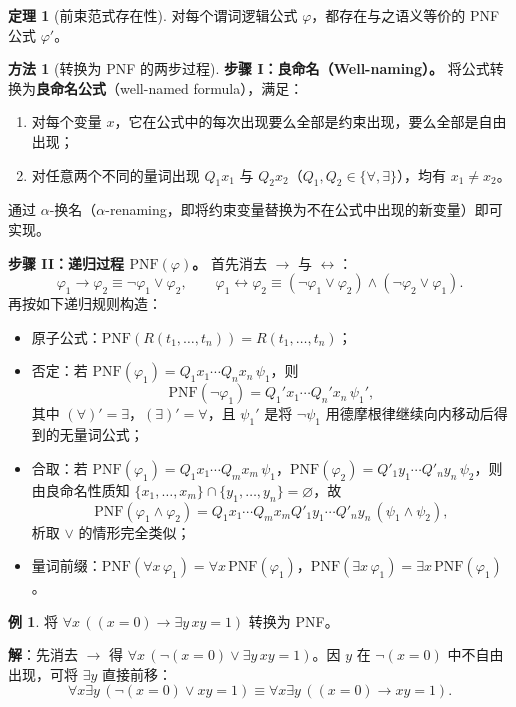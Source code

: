 \documentclass[UTF8,11pt,a4paper]{ctexbook}   %
\theoremstyle{definition}
\newtheorem{theorem}{定理}[section]
\newtheorem{example}{例}[section]
\newtheorem{method}{方法}[section]
\begin{document}
\begin{theorem}[前束范式存在性]
对每个谓词逻辑公式 $\varphi$，都存在与之语义等价的 PNF 公式 $\varphi'$。
\end{theorem}

\begin{method}[转换为 PNF 的两步过程]

\textbf{步骤 I：良命名（Well-naming）。}
将公式转换为\textbf{良命名公式}（well-named formula），满足：
\begin{enumerate}
    \item 对每个变量 $x$，它在公式中的每次出现要么全部是约束出现，要么全部是自由出现；
    \item 对任意两个不同的量词出现 $Q_1x_1$ 与 $Q_2x_2$（$Q_1,Q_2\in\{\forall,\exists\}$），均有 $x_1\neq x_2$。
\end{enumerate}
通过 $\alpha$-换名（$\alpha$-renaming，即将约束变量替换为不在公式中出现的新变量）即可实现。

\textbf{步骤 II：递归过程 $\mathrm{PNF}(\varphi)$。}
首先消去 $\to$ 与 $\leftrightarrow$：
\[
\varphi_1\to\varphi_2\equiv\neg\varphi_1\lor\varphi_2,\qquad
\varphi_1\leftrightarrow\varphi_2\equiv(\neg\varphi_1\lor\varphi_2)\land(\neg\varphi_2\lor\varphi_1).
\]
再按如下递归规则构造：
\begin{itemize}
    \item 原子公式：$\mathrm{PNF}(R(t_1,\dots,t_n))=R(t_1,\dots,t_n)$；
    \item 否定：若 $\mathrm{PNF}(\varphi_1)=Q_1x_1\cdots Q_nx_n\,\psi_1$，则
    \[
    \mathrm{PNF}(\neg\varphi_1)=Q_1'x_1\cdots Q_n'x_n\,\psi_1',
    \]
    其中 $(\forall)'=\exists$，$(\exists)'=\forall$，且 $\psi_1'$ 是将 $\neg\psi_1$ 用德摩根律继续向内移动后得到的无量词公式；
    \item 合取：若 $\mathrm{PNF}(\varphi_1)=Q_1x_1\cdots Q_mx_m\,\psi_1$，$\mathrm{PNF}(\varphi_2)=Q'_1y_1\cdots Q'_ny_n\,\psi_2$，则由良命名性质知 $\{x_1,\dots,x_m\}\cap\{y_1,\dots,y_n\}=\varnothing$，故
    \[
    \mathrm{PNF}(\varphi_1\land\varphi_2)=Q_1x_1\cdots Q_mx_mQ'_1y_1\cdots Q'_ny_n\,(\psi_1\land\psi_2),
    \]
    析取 $\lor$ 的情形完全类似；
    \item 量词前缀：$\mathrm{PNF}(\forall x\,\varphi_1)=\forall x\,\mathrm{PNF}(\varphi_1)$，$\mathrm{PNF}(\exists x\,\varphi_1)=\exists x\,\mathrm{PNF}(\varphi_1)$。
\end{itemize}
\end{method}

\begin{example}
将 $\forall x\,((x=0)\to\exists y\,xy=1)$ 转换为 PNF。

\textbf{解}：先消去 $\to$ 得 $\forall x\,(\neg(x=0)\lor\exists y\,xy=1)$。因 $y$ 在 $\neg(x=0)$ 中不自由出现，可将 $\exists y$ 直接前移：
\[
\forall x\exists y\,(\neg(x=0)\lor xy=1)\equiv\forall x\exists y\,((x=0)\to xy=1).
\]
\end{example}
\end{document}
